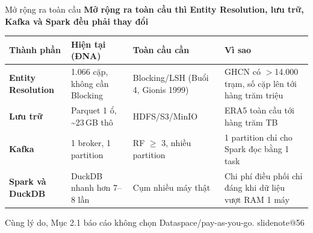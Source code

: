 \documentclass[t,aspectratio=169,12pt]{beamer}
\makeatletter
\newcommand{\slidenote}[1]{\ifcsname slidenote@#1\endcsname\note{\csname slidenote@#1\endcsname}\fi}
\newcommand{\ychinh}[1]{\vskip1mm{\bfseries #1}\par\vskip1mm}
\newcommand{\nguon}[1]{\vskip1mm{\scriptsize\color{mutedgray}#1}}
\makeatother
\begin{document}
\begin{frame}{Mở rộng ra toàn cầu}
  \ychinh{Mở rộng ra toàn cầu thì Entity Resolution, lưu trữ, Kafka và Spark đều phải thay đổi}
  \scriptsize
  \renewcommand{\arraystretch}{0.95}
  \begin{tabular}{@{}>{\bfseries}p{2.6cm}p{3.1cm}p{3.6cm}p{4.3cm}@{}}
    \toprule
    Thành phần & Hiện tại (ĐNA) & Toàn cầu cần & Vì sao \\
    \midrule
    Entity Resolution & 1.066 cặp, không cần Blocking & Blocking/LSH (Buổi 4, Gionis 1999) & GHCN có $>$14.000 trạm, số cặp lên tới hàng trăm triệu \\
    Lưu trữ & Parquet 1 ổ, \textasciitilde 23\,GB thô & HDFS/S3/MinIO & ERA5 toàn cầu tới hàng trăm TB \\
    Kafka & 1 broker, 1 partition & RF $\geq$ 3, nhiều partition & 1 partition chỉ cho Spark đọc bằng 1 task \\
    Spark và DuckDB & DuckDB nhanh hơn 7--8 lần & Cụm nhiều máy thật & Chi phí điều phối chỉ đáng khi dữ liệu vượt RAM 1 máy \\
    \bottomrule
  \end{tabular}
  \nguon{Cùng lý do, Mục 2.1 báo cáo không chọn Dataspace/pay-as-you-go.}
  \slidenote{56}
\end{frame}
\end{document}
